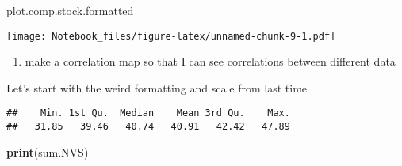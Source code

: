 \documentclass[
]{article}
\newenvironment{Shaded}{\begin{snugshade}}{\end{snugshade}}
\newcommand{\KeywordTok}[1]{\textcolor[rgb]{0.13,0.29,0.53}{\textbf{#1}}}
\newcommand{\NormalTok}[1]{#1}
\newcommand{\OperatorTok}[1]{\textcolor[rgb]{0.81,0.36,0.00}{\textbf{#1}}}
\newcommand{\StringTok}[1]{\textcolor[rgb]{0.31,0.60,0.02}{#1}}
\providecommand{\tightlist}{%
  \setlength{\itemsep}{0pt}\setlength{\parskip}{0pt}}
\begin{document}
\begin{Shaded}
\begin{Highlighting}[]
\NormalTok{plot.comp.stock.formatted}
\end{Highlighting}
\end{Shaded}

\texttt{[image: Notebook\_files/figure-latex/unnamed-chunk-9-1.pdf]}

\begin{enumerate}
\def\labelenumi{\arabic{enumi}.}
\setcounter{enumi}{1}
\tightlist
\item
  make a correlation map so that I can see correlations between
  different data
\end{enumerate}

Let's start with the weird formatting and scale from last time

\begin{Shaded}
\end{Shaded}

\begin{verbatim}
##    Min. 1st Qu.  Median    Mean 3rd Qu.    Max. 
##   31.85   39.46   40.74   40.91   42.42   47.89
\end{verbatim}

\begin{Shaded}
\begin{Highlighting}[]
\KeywordTok{print}\NormalTok{(sum.NVS)}
\end{Highlighting}
\end{Shaded}
\end{document}
